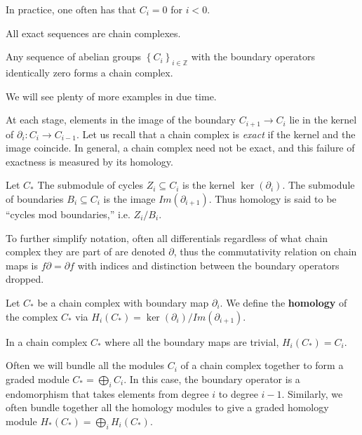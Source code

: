 In practice, one often has that $C_i = 0$ for $i<0$.


\begin{example} All exact sequences are chain complexes.
\end{example}

\begin{example} Any sequence of abelian groups $\left\{C_i\right\}_{i \in
\mathbb{Z}}$ with the boundary operators
identically zero forms a chain complex. 
\end{example}

We will see plenty of more examples in due time.

At each stage, elements in the image of the boundary $C_{i+1} \to C_i$ lie in
the kernel of $\partial_i: C_i \to C_{i-1}$. 	Let us recall that a chain
complex is \emph{exact} if the kernel and the image coincide. In general, a
chain complex need not be exact, and this failure of exactness is measured by
its homology.

\begin{definition} 
Let $C_*$
The submodule of cycles $Z_i\subseteq C_i$ is
the kernel $\ker(\partial_i)$. The submodule of boundaries
$B_i\subseteq C_i$ is the image $Im(\partial_{i+1})$. Thus
homology is said to be ``cycles mod boundaries,'' i.e.
$Z_i/B_i$.
\end{definition}

To further simplify notation, often all differentials regardless
of what chain complex they are part of are denoted $\partial$,
thus the commutativity relation on chain maps is
$f\partial=\partial f$ with indices and distinction between the
boundary operators dropped.


\begin{definition} Let $C_*$ be a chain complex with boundary
map $\partial_i$.
We define the \textbf{homology} of the complex $C_*$ via
$H_i(C_*)=\ker(\partial_i)/Im(\partial_{i+1})$.
\end{definition}

\begin{example} In a chain complex $C_*$ where all the boundary
maps are
trivial, $H_i(C_*)=C_i$. 
\end{example}

Often we will bundle all the modules $C_i$ of a chain complex
together to form a graded module $C_*=\bigoplus_i C_i$. In this
case, the boundary operator is a
endomorphism that takes elements from degree $i$ to degree
$i-1$. Similarly, we
often bundle together all the homology modules to give a graded
homology module
$H_*(C_*)=\bigoplus_i H_i(C_*)$.

